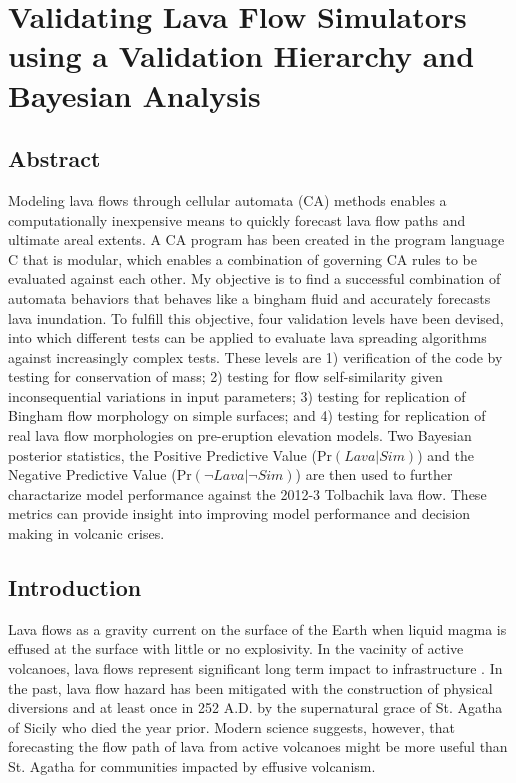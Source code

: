 \chapter[Validating Lava Flow Simulators using a Validation Hierarchy and Bayesian Analysis]{Validating Lava Flow Simulators using a Validation Hierarchy and Bayesian Analysis}\label{ch_molasses}


\renewcommand*{\FigPath}{figures/chapter-molasses}

\section*{Abstract}
	Modeling lava flows through cellular automata (CA) methods enables a computationally inexpensive means to quickly forecast lava flow paths and ultimate areal extents. A CA program has been created in the program language C that is modular, which enables a combination of governing CA rules to be evaluated against each other. My objective is to find a successful combination of automata behaviors that behaves like a bingham fluid and accurately forecasts lava inundation. To fulfill this objective, four validation levels have been devised, into which different tests can be applied to evaluate lava spreading algorithms against increasingly complex tests. These levels are 1) verification of the code by testing for conservation of mass; 2) testing for flow self-similarity given inconsequential variations in input parameters; 3) testing for replication of Bingham flow morphology on simple surfaces; and 4) testing for replication of real lava flow morphologies on pre-eruption elevation models. Two Bayesian posterior statistics, the Positive Predictive Value ($\text{Pr}(Lava|Sim)$) and the Negative Predictive Value ($\text{Pr}(\neg Lava|\neg Sim)$) are then used to further charactarize model performance against the 2012-3 Tolbachik lava flow. These metrics can provide insight into improving model performance and decision making in volcanic crises.

\section{Introduction}
	Lava flows as a gravity current on the surface of the Earth when liquid magma is effused at the surface with little or no explosivity. In the vacinity of active volcanoes, lava flows represent significant long term impact to infrastructure \citep{peterson2000lava}. In the past, lava flow hazard has been mitigated with the construction of physical diversions and at least once in 252 A.D. by the supernatural grace of St. Agatha of Sicily who died the year prior. Modern science suggests, however, that forecasting the flow path of lava from active volcanoes might be more useful than St. Agatha for communities impacted by effusive volcanism.

